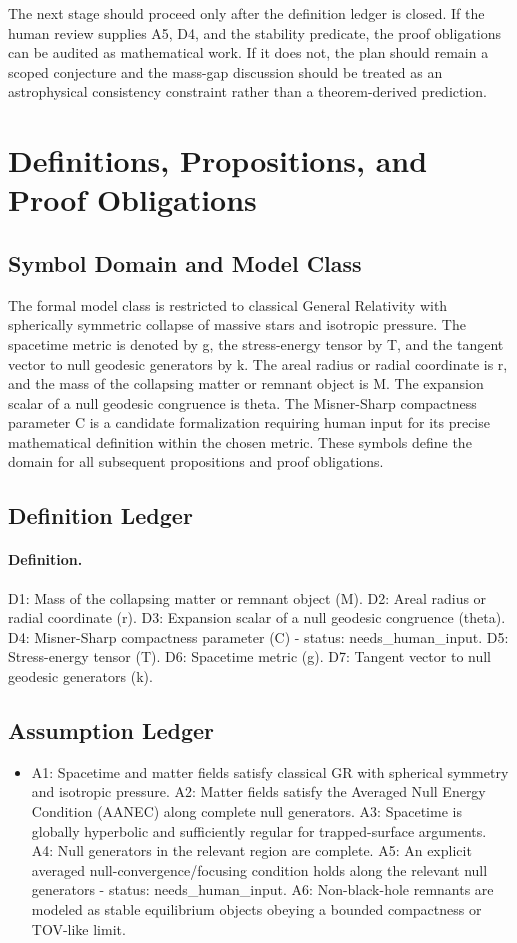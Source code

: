 \documentclass[conference]{IEEEtran}
\begin{document}
The next stage should proceed only after the definition ledger is closed. If the human review supplies A5, D4, and the stability predicate, the proof obligations can be audited as mathematical work. If it does not, the plan should remain a scoped conjecture and the mass-gap discussion should be treated as an astrophysical consistency constraint rather than a theorem-derived prediction.

\section{Definitions, Propositions, and Proof Obligations}
\subsection{Symbol Domain and Model Class}
The formal model class is restricted to classical General Relativity with spherically symmetric collapse of massive stars and isotropic pressure. The spacetime metric is denoted by g, the stress-energy tensor by T, and the tangent vector to null geodesic generators by k. The areal radius or radial coordinate is r, and the mass of the collapsing matter or remnant object is M. The expansion scalar of a null geodesic congruence is theta. The Misner-Sharp compactness parameter C is a candidate formalization requiring human input for its precise mathematical definition within the chosen metric. These symbols define the domain for all subsequent propositions and proof obligations.

\subsection{Definition Ledger}
\paragraph{Definition.} D1: Mass of the collapsing matter or remnant object (M). D2: Areal radius or radial coordinate (r). D3: Expansion scalar of a null geodesic congruence (theta). D4: Misner-Sharp compactness parameter (C) - status: needs\_human\_input. D5: Stress-energy tensor (T). D6: Spacetime metric (g). D7: Tangent vector to null geodesic generators (k).

\subsection{Assumption Ledger}
\begin{itemize}
\item A1: Spacetime and matter fields satisfy classical GR with spherical symmetry and isotropic pressure. A2: Matter fields satisfy the Averaged Null Energy Condition (AANEC) along complete null generators. A3: Spacetime is globally hyperbolic and sufficiently regular for trapped-surface arguments. A4: Null generators in the relevant region are complete. A5: An explicit averaged null-convergence/focusing condition holds along the relevant null generators - status: needs\_human\_input. A6: Non-black-hole remnants are modeled as stable equilibrium objects obeying a bounded compactness or TOV-like limit.
\end{itemize}
\end{document}
